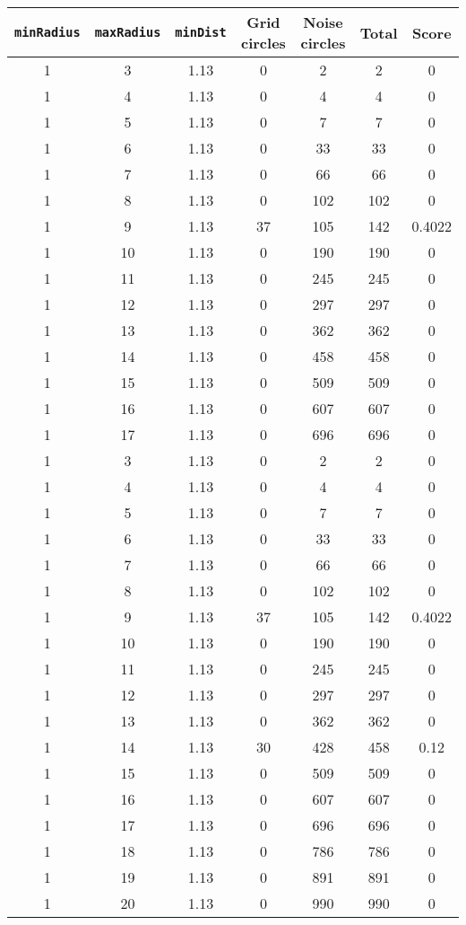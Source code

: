 \documentclass[letterpaper, 12pt]{article}
\begin{document}
\begin{longtable}{|c|c|c|c|c|c|c|}
\hline
\textbf{\texttt{minRadius}} & \textbf{\texttt{maxRadius}} & \textbf{\texttt{minDist}} & \textbf{Grid circles} & \textbf{Noise circles} & \textbf{Total} & \textbf{Score} \\
\hline
1 & 3 & 1.13 & 0 & 2 & 2 & 0 \\
\hline
1 & 4 & 1.13 & 0 & 4 & 4 & 0 \\
\hline
1 & 5 & 1.13 & 0 & 7 & 7 & 0 \\
\hline
1 & 6 & 1.13 & 0 & 33 & 33 & 0 \\
\hline
1 & 7 & 1.13 & 0 & 66 & 66 & 0 \\
\hline
1 & 8 & 1.13 & 0 & 102 & 102 & 0 \\
\hline
1 & 9 & 1.13 & 37 & 105 & 142 & 0.4022 \\
\hline
1 & 10 & 1.13 & 0 & 190 & 190 & 0 \\
\hline
1 & 11 & 1.13 & 0 & 245 & 245 & 0 \\
\hline
1 & 12 & 1.13 & 0 & 297 & 297 & 0 \\
\hline
1 & 13 & 1.13 & 0 & 362 & 362 & 0 \\
\hline
1 & 14 & 1.13 & 0 & 458 & 458 & 0 \\
\hline
1 & 15 & 1.13 & 0 & 509 & 509 & 0 \\
\hline
1 & 16 & 1.13 & 0 & 607 & 607 & 0 \\
\hline
1 & 17 & 1.13 & 0 & 696 & 696 & 0 \\
\hline
1 & 3 & 1.13 & 0 & 2 & 2 & 0 \\
\hline
1 & 4 & 1.13 & 0 & 4 & 4 & 0 \\
\hline
1 & 5 & 1.13 & 0 & 7 & 7 & 0 \\
\hline
1 & 6 & 1.13 & 0 & 33 & 33 & 0 \\
\hline
1 & 7 & 1.13 & 0 & 66 & 66 & 0 \\
\hline
1 & 8 & 1.13 & 0 & 102 & 102 & 0 \\
\hline
1 & 9 & 1.13 & 37 & 105 & 142 & 0.4022 \\
\hline
1 & 10 & 1.13 & 0 & 190 & 190 & 0 \\
\hline
1 & 11 & 1.13 & 0 & 245 & 245 & 0 \\
\hline
1 & 12 & 1.13 & 0 & 297 & 297 & 0 \\
\hline
1 & 13 & 1.13 & 0 & 362 & 362 & 0 \\
\hline
1 & 14 & 1.13 & 30 & 428 & 458 & 0.12 \\
\hline
1 & 15 & 1.13 & 0 & 509 & 509 & 0 \\
\hline
1 & 16 & 1.13 & 0 & 607 & 607 & 0 \\
\hline
1 & 17 & 1.13 & 0 & 696 & 696 & 0 \\
\hline
1 & 18 & 1.13 & 0 & 786 & 786 & 0 \\
\hline
1 & 19 & 1.13 & 0 & 891 & 891 & 0 \\
\hline
1 & 20 & 1.13 & 0 & 990 & 990 & 0 \\
\hline
\end{longtable}
\end{document}
